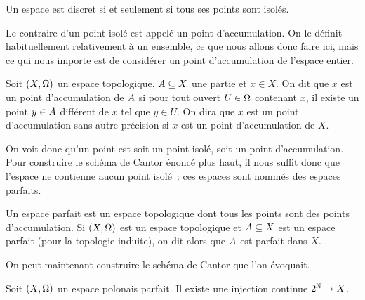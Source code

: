 \begin{remark}
  Un espace est discret si et seulement si tous ses points sont isolés.
\end{remark}

Le contraire d'un point isolé est appelé un point d'accumulation. On le définit
habituellement relativement à un ensemble, ce que nous allons donc faire ici,
mais ce qui nous importe est de considérer un point d'accumulation de l'espace
entier.

\begin{definition}
  Soit $(X,\Omega)$ un espace topologique, $A\subseteq X$ une partie et
  $x\in X$. On dit que $x$ est un point d'accumulation de $A$ si pour tout
  ouvert $U\in\Omega$ contenant $x$, il existe un point $y\in A$
  différent de $x$ tel que $y\in U$. On dira que $x$ est un point d'accumulation
  sans autre précision si $x$ est un point d'accumulation de $X$.
\end{definition}

On voit donc qu'un point est soit un point isolé, soit un point d'accumulation.
Pour construire le schéma de Cantor énoncé plus haut, il nous suffit donc
que l'espace ne contienne aucun point isolé~: ces espaces sont nommés des
espaces parfaits.

\begin{definition}
  Un espace parfait est un espace topologique dont tous les points sont des
  points d'accumulation. Si $(X,\Omega)$ est un espace topologique et
  $A\subseteq X$ est un espace parfait (pour la topologie induite), on dit
  alors que $A$ est parfait dans $X$.
\end{definition}

\noindent
On peut maintenant construire le schéma de Cantor que l'on évoquait.

\begin{proposition}
  Soit $(X,\Omega)$ un espace polonais parfait. Il existe une injection continue
  $2^{\mathbb N} \to X$.
\end{proposition}

